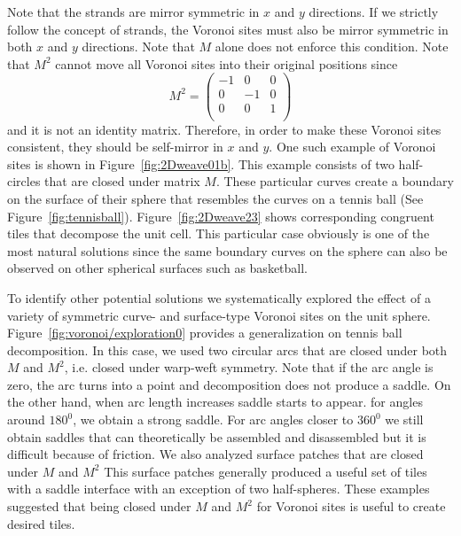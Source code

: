 \documentclass[times,twocolumn,final]{elsarticle}
\begin{document}
Note that the strands are mirror symmetric in $x$ and $y$ directions. If we strictly follow the concept of strands, the Voronoi sites must also be mirror symmetric in both $x$ and $y$ directions. Note that $M$ alone does not enforce this condition. Note that $M^2$ cannot move all Voronoi sites into their original positions since  
\begin{equation} M^2 =
\begin{pmatrix}
-1 & 0 & 0\\
0 & -1 & 0\\
0 & 0 & 1\\
\end{pmatrix}
\label{Eq:Matrix2}
\end{equation}
and it is not an identity matrix. Therefore, in order to make these Voronoi sites consistent, they should be self-mirror in $x$ and $y$. One such example of Voronoi sites is shown in Figure~\ref{fig:2Dweave01b}. This example consists of two half-circles that are closed under matrix $M$. These particular curves create a boundary on the surface of their sphere that resembles the curves on a tennis ball (See Figure~\ref{fig:tennisball}). Figure~\ref{fig:2Dweave23} shows corresponding congruent tiles that decompose the unit cell. 
This particular case obviously is one of the most natural solutions since the same boundary curves on the sphere can also be observed on other spherical surfaces such as basketball. 


To identify other potential solutions we systematically explored the effect of a variety of symmetric curve- and surface-type Voronoi sites on the unit sphere. Figure~\ref{fig:voronoi/exploration0} provides a generalization on tennis ball decomposition. In this case, we used two circular arcs that are closed under both $M$ and $M^2$, i.e. closed under warp-weft symmetry. Note that if the arc angle is zero, the arc turns into a point and decomposition does not produce a saddle. On the other hand, when arc length increases saddle starts to appear. for angles around $180^0$, we obtain a strong saddle. For arc angles closer to $360^0$ we still obtain saddles that can theoretically be assembled and disassembled but it is difficult because of friction.  
We also analyzed surface patches that are closed under $M$ and  $M^2$ 
This surface patches generally produced a useful set of tiles with a saddle interface with an exception of two half-spheres. 
These examples suggested that being closed under $M$ and $M^2$ for Voronoi sites is useful to create desired tiles. 
\end{document}
